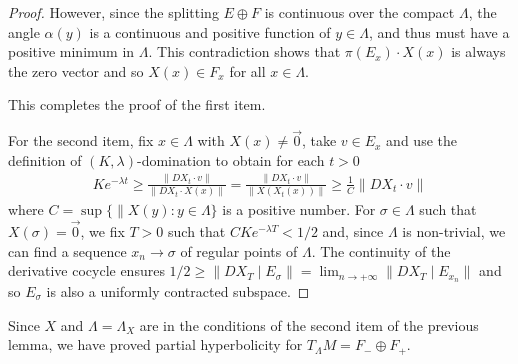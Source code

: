 \documentclass[12pt,reqno]{amsart}
\numberwithin{equation}{section}
\theoremstyle{plain}
\newtheorem{lemma}[theorem]{Lemma}
\theoremstyle{definition}
\begin{document}
\begin{proof}
  However, since the splitting $E\oplus F$ is continuous
  over the compact $\Lambda$, the angle $\alpha(y)$ is a
  continuous and positive function of $y\in\Lambda$, and
  thus must have a positive minimum in $\Lambda$. This
  contradiction shows that $\pi(E_x)\cdot X(x)$ is always
  the zero vector and so $X(x)\in F_x$ for all
  $x\in\Lambda$.

  This completes the proof of the first item.

    For the second item, fix $x\in\Lambda$
    with $X(x)\neq\vec0$, take $v\in E_x$ and use the
    definition of $(K,\lambda)$-domination to obtain for
    each $t>0$
  \begin{align*}
    K e^{-\lambda t}\ge \frac{\|DX_t\cdot v\|}{\|DX_t\cdot X(x)\|}
    =
    \frac{\|DX_t\cdot v\|}{\|X(X_t(x))\|}
    \ge
    \frac1C\|DX_t\cdot v\|
  \end{align*}
  where $C=\sup\{\|X(y):y\in\Lambda\}$ is a positive
  number. For $\sigma\in\Lambda$ such that
  $X(\sigma)=\vec0$, we fix $T>0$ such that $CK e^{-\lambda
    T}<1/2$ and, since $\Lambda$ is non-trivial, we can find
  a sequence $x_n\to\sigma$ of regular points of
  $\Lambda$. The continuity of the derivative cocycle
  ensures $1/2\ge\|DX_T\mid E_\sigma\|=\lim_{n\to+\infty}
  \|DX_T\mid E_{x_n}\|$ and so $E_\sigma$ is also a
  uniformly contracted subspace.
\end{proof}

Since $X$ and $\Lambda=\Lambda_X$ are in the conditions of the
second item of the previous lemma, we have proved partial
hyperbolicity for $T_{\Lambda}M=F_-\oplus F_+$.






\end{document}
